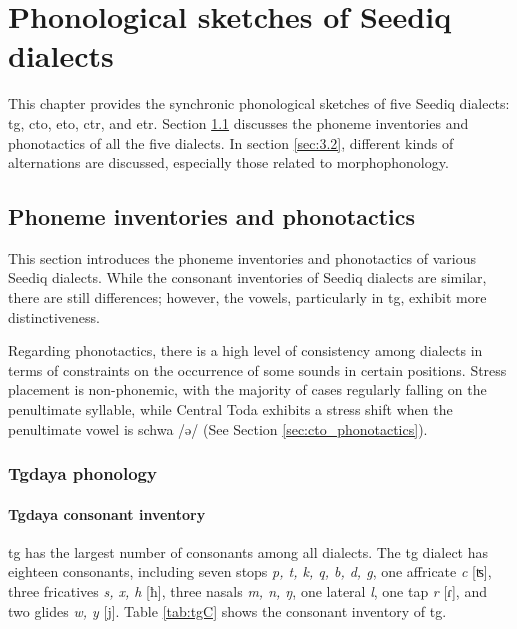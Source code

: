 \chapter{Phonological sketches of Seediq dialects}\label{ch3}

This chapter provides the synchronic phonological sketches of five Seediq dialects: \acl{tg}, \acl{cto}, \acl{eto}, \acl{ctr}, and \acl{etr}. Section \ref{sec:3.1} discusses the phoneme inventories and phonotactics of all the five dialects. In section \ref{sec:3.2}, different kinds of alternations are discussed, especially those related to morphophonology.

\section{Phoneme inventories and phonotactics} \label{sec:3.1}

This section introduces the phoneme inventories and phonotactics of various Seediq dialects. While the consonant inventories of Seediq dialects are similar, there are still differences; however, the vowels, particularly in \acl{tg}, exhibit more distinctiveness.

Regarding phonotactics, there is a high level of consistency among dialects in terms of constraints on the occurrence of some sounds in certain positions. Stress placement is non-phonemic, with the majority of cases regularly falling on the penultimate syllable, while Central Toda exhibits a stress shift when the penultimate vowel is schwa /ə/ (See Section \ref{sec:cto_phonotactics}).

\subsection{Tgdaya phonology}

\subsubsection{Tgdaya consonant inventory}

\acl{tg} has the largest number of consonants among all dialects. The \acl{tg} dialect has eighteen consonants, including seven stops \textit{p, t, k, q, b, d, g}, one affricate \textit{c} [ʦ], three fricatives \textit{s, x, h} [ħ], three nasals \textit{m, n, ŋ}, one lateral \textit{l}, one tap \textit{r} [ɾ], and two glides \textit{w, y} [j]. Table \ref{tab:tgC} shows the consonant inventory of \acl{tg}.

